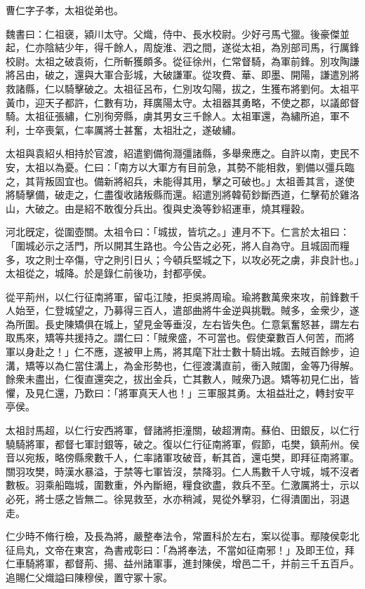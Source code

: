 
\begin{pinyinscope}
曹仁字子孝，太祖從弟也。

魏書曰：仁祖襃，潁川太守。父熾，侍中、長水校尉。少好弓馬弋獵。後豪傑並起，仁亦陰結少年，得千餘人，周旋淮、泗之間，遂從太祖，為別部司馬，行厲鋒校尉。太祖之破袁術，仁所斬獲頗多。從征徐州，仁常督騎，為軍前鋒。別攻陶謙將呂由，破之，還與大軍合彭城，大破謙軍。從攻費、華、即墨、開陽，謙遣別將救諸縣，仁以騎擊破之。太祖征呂布，仁別攻勾陽，拔之，生獲布將劉何。太祖平黃巾，迎天子都許，仁數有功，拜廣陽太守。太祖器其勇略，不使之郡，以議郎督騎。太祖征張繡，仁別徇旁縣，虜其男女三千餘人。太祖軍還，為繡所追，軍不利，士卒喪氣，仁率厲將士甚奮，太祖壯之，遂破繡。

太祖與袁紹乆相持於官渡，紹遣劉備徇㶏彊諸縣，多舉衆應之。自許以南，吏民不安，太祖以為憂。仁曰：「南方以大軍方有目前急，其勢不能相救，劉備以彊兵臨之，其背叛固宜也。備新將紹兵，未能得其用，擊之可破也。」太祖善其言，遂使將騎擊備，破走之，仁盡復收諸叛縣而還。紹遣別將韓荀鈔斷西道，仁擊荀於雞洛山，大破之。由是紹不敢復分兵出。復與史渙等鈔紹運車，燒其糧穀。

河北旣定，從圍壺關。太祖令曰：「城拔，皆坑之。」連月不下。仁言於太祖曰：「圍城必示之活門，所以開其生路也。今公告之必死，將人自為守。且城固而糧多，攻之則士卒傷，守之則引日乆；今頓兵堅城之下，以攻必死之虜，非良計也。」太祖從之，城降。於是錄仁前後功，封都亭侯。

從平荊州，以仁行征南將軍，留屯江陵，拒吳將周瑜。瑜將數萬衆來攻，前鋒數千人始至，仁登城望之，乃募得三百人，遣部曲將牛金逆與挑戰。賊多，金衆少，遂為所圍。長史陳矯俱在城上，望見金等垂沒，左右皆失色。仁意氣奮怒甚，謂左右取馬來，矯等共援持之。謂仁曰：「賊衆盛，不可當也。假使棄數百人何苦，而將軍以身赴之！」仁不應，遂被甲上馬，將其麾下壯士數十騎出城。去賊百餘步，迫溝，矯等以為仁當住溝上，為金形勢也，仁徑渡溝直前，衝入賊圍，金等乃得解。餘衆未盡出，仁復直還突之，拔出金兵，亡其數人，賊衆乃退。矯等初見仁出，皆懼，及見仁還，乃歎曰：「將軍真天人也！」三軍服其勇。太祖益壯之，轉封安平亭侯。

太祖討馬超，以仁行安西將軍，督諸將拒潼關，破超渭南。蘇伯、田銀反，以仁行驍騎將軍，都督七軍討銀等，破之。復以仁行征南將軍，假節，屯樊，鎮荊州。侯音以宛叛，略傍縣衆數千人，仁率諸軍攻破音，斬其首，還屯樊，即拜征南將軍。關羽攻樊，時漢水暴溢，于禁等七軍皆沒，禁降羽。仁人馬數千人守城，城不沒者數板。羽乘船臨城，圍數重，外內斷絕，糧食欲盡，救兵不至。仁激厲將士，示以必死，將士感之皆無二。徐晃救至，水亦稍減，晃從外擊羽，仁得潰圍出，羽退走。

仁少時不脩行檢，及長為將，嚴整奉法令，常置科於左右，案以從事。鄢陵侯彰北征烏丸，文帝在東宮，為書戒彰曰：「為將奉法，不當如征南邪！」及即王位，拜仁車騎將軍，都督荊、揚、益州諸軍事，進封陳侯，增邑二千，并前三千五百戶。追賜仁父熾謚曰陳穆侯，置守冢十家。


\end{pinyinscope}
